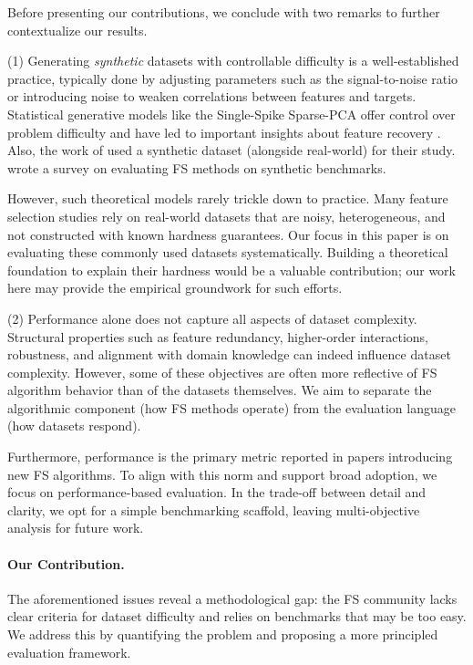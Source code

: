 \documentclass[preprint,12pt,authoryear]{elsarticle}
\begin{document}
Before presenting our contributions, we conclude with two remarks to further contextualize our results. 

(1) Generating \emph{synthetic} datasets with controllable difficulty is a well-established practice, typically done by adjusting parameters such as the signal-to-noise ratio or introducing noise to weaken correlations between features and targets. Statistical generative models like the Single-Spike Sparse-PCA offer control over problem difficulty and have led to important insights about feature recovery \cite{RigolletAOS,johnstone2009consistency,Wainwright06,AminiWain09}. Also, the work of \cite{ho2002complexity} used a synthetic dataset (alongside real-world) for their study.
 \cite{bolon2013review} wrote a survey on evaluating FS methods on synthetic benchmarks.

However, such theoretical models rarely trickle down to practice. Many feature selection studies rely on real-world datasets that are noisy, heterogeneous, and not constructed with known hardness guarantees. Our focus in this paper is on evaluating these commonly used datasets systematically. Building a theoretical foundation to explain their hardness would be a valuable contribution; our work here may provide the empirical groundwork for such efforts. 


(2) Performance alone does not capture all aspects of dataset complexity. Structural properties such as feature redundancy, higher-order interactions, robustness, and alignment with domain knowledge can indeed influence dataset complexity. However, some of these objectives are often more reflective of FS algorithm behavior than of the datasets themselves. We aim to separate the algorithmic component (how FS methods operate) from the evaluation language (how datasets respond).

Furthermore, performance is the primary metric reported in papers introducing new FS algorithms. To align with this norm and support broad adoption, we focus on performance-based evaluation. In the trade-off between detail and clarity, we opt for a simple benchmarking scaffold, leaving multi-objective analysis for future work.



\paragraph{{\bf Our Contribution.}}
The aforementioned issues reveal a methodological gap: the FS community lacks clear criteria for dataset difficulty and relies on benchmarks that may be too easy. We address this by quantifying the problem and proposing a more principled evaluation framework.
\end{document}
